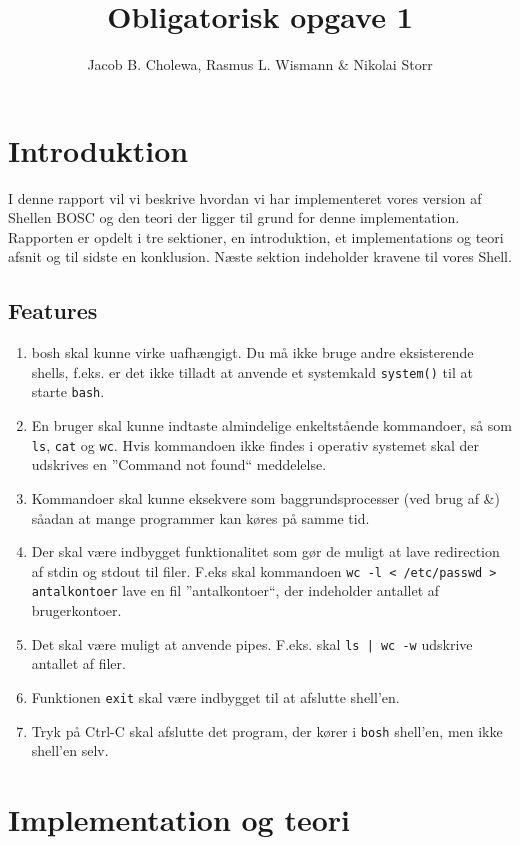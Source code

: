 \documentclass[danish]{report}
\title{Obligatorisk opgave 1}
\author{Jacob B. Cholewa, Rasmus L. Wismann \& Nikolai Storr }
\begin{document}
\maketitle
\newpage
\tableofcontents
\newpage

\chapter{Introduktion}

I denne rapport vil vi beskrive hvordan vi har implementeret vores version af Shellen BOSC og den teori der ligger til grund for denne implementation. Rapporten er opdelt i tre sektioner, en introduktion, et implementations og teori afsnit og til sidste en konklusion. Næste sektion indeholder kravene til vores Shell.  

\section{Features}
\begin{enumerate}
\item bosh skal kunne virke uafhængigt. Du må ikke bruge andre eksisterende shells, f.eks. er det ikke tilladt at anvende et systemkald {\tt system()} til at starte {\tt bash}.
\item En bruger skal kunne indtaste almindelige enkeltstående kommandoer, så som {\tt ls}, {\tt cat} og {\tt wc}. Hvis kommandoen ikke findes i operativ systemet skal der udskrives en ”Command not found“ meddelelse.
\item Kommandoer skal kunne eksekvere som baggrundsprocesser (ved brug af \&) såadan at mange programmer kan køres på samme tid.
\item Der skal være indbygget funktionalitet som gør de muligt at lave redirection af stdin og stdout til filer. F.eks skal kommandoen {\tt wc -l < /etc/passwd > antalkontoer} lave en fil ”antalkontoer“, der indeholder antallet af brugerkontoer.
\item Det skal være muligt at anvende pipes. F.eks. skal {\tt ls | wc -w} udskrive antallet af filer.
\item Funktionen {\tt exit} skal være indbygget til at afslutte shell’en.
\item Tryk på Ctrl-C skal afslutte det program, der kører i {\tt bosh} shell’en, men ikke shell’en selv.
\end{enumerate}

\chapter{Implementation og teori}
\end{document}
